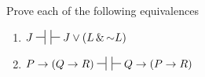 \practiceproblems
 	

\noindent\problempart
Prove each of the following equivalences
\begin{enumerate}[label=(\arabic*)]

\item $J \nsststile{}{} \hspace{.5em} \sststile{}{} J\eor (L\eand\enot L)$


\item $P \eif (Q \eif R) \nsststile{}{} \hspace{.5em} \sststile{}{} Q \eif (P \eif R)$


%
%
%
%


\end{enumerate}
